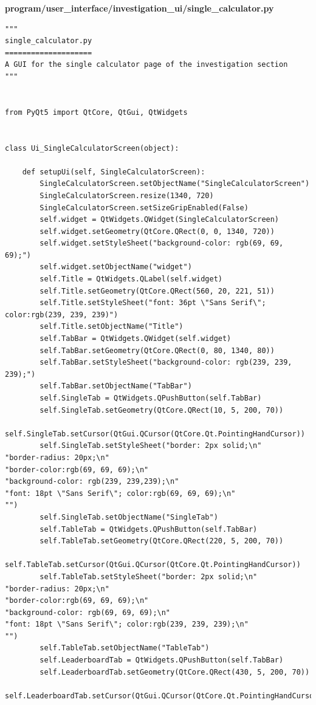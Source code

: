 \documentclass{article}
\begin{document}
\textbf{program/user\_interface/investigation\_ui/single\_calculator.py}

\begin{lstlisting}
"""
single_calculator.py
====================
A GUI for the single calculator page of the investigation section
"""


from PyQt5 import QtCore, QtGui, QtWidgets


class Ui_SingleCalculatorScreen(object):

    def setupUi(self, SingleCalculatorScreen):
        SingleCalculatorScreen.setObjectName("SingleCalculatorScreen")
        SingleCalculatorScreen.resize(1340, 720)
        SingleCalculatorScreen.setSizeGripEnabled(False)
        self.widget = QtWidgets.QWidget(SingleCalculatorScreen)
        self.widget.setGeometry(QtCore.QRect(0, 0, 1340, 720))
        self.widget.setStyleSheet("background-color: rgb(69, 69, 69);")
        self.widget.setObjectName("widget")
        self.Title = QtWidgets.QLabel(self.widget)
        self.Title.setGeometry(QtCore.QRect(560, 20, 221, 51))
        self.Title.setStyleSheet("font: 36pt \"Sans Serif\"; color:rgb(239, 239, 239)")
        self.Title.setObjectName("Title")
        self.TabBar = QtWidgets.QWidget(self.widget)
        self.TabBar.setGeometry(QtCore.QRect(0, 80, 1340, 80))
        self.TabBar.setStyleSheet("background-color: rgb(239, 239, 239);")
        self.TabBar.setObjectName("TabBar")
        self.SingleTab = QtWidgets.QPushButton(self.TabBar)
        self.SingleTab.setGeometry(QtCore.QRect(10, 5, 200, 70))
        self.SingleTab.setCursor(QtGui.QCursor(QtCore.Qt.PointingHandCursor))
        self.SingleTab.setStyleSheet("border: 2px solid;\n"
"border-radius: 20px;\n"
"border-color:rgb(69, 69, 69);\n"
"background-color: rgb(239, 239,239);\n"
"font: 18pt \"Sans Serif\"; color:rgb(69, 69, 69);\n"
"")
        self.SingleTab.setObjectName("SingleTab")
        self.TableTab = QtWidgets.QPushButton(self.TabBar)
        self.TableTab.setGeometry(QtCore.QRect(220, 5, 200, 70))
        self.TableTab.setCursor(QtGui.QCursor(QtCore.Qt.PointingHandCursor))
        self.TableTab.setStyleSheet("border: 2px solid;\n"
"border-radius: 20px;\n"
"border-color:rgb(69, 69, 69);\n"
"background-color: rgb(69, 69, 69);\n"
"font: 18pt \"Sans Serif\"; color:rgb(239, 239, 239);\n"
"")
        self.TableTab.setObjectName("TableTab")
        self.LeaderboardTab = QtWidgets.QPushButton(self.TabBar)
        self.LeaderboardTab.setGeometry(QtCore.QRect(430, 5, 200, 70))
        self.LeaderboardTab.setCursor(QtGui.QCursor(QtCore.Qt.PointingHandCursor))

\end{lstlisting}
\end{document}
